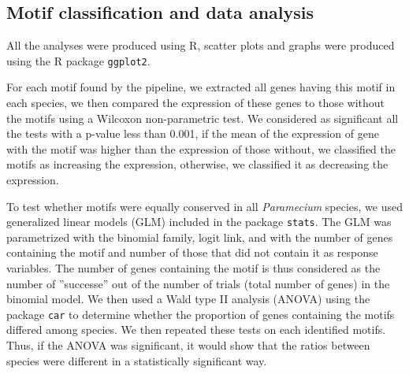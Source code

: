 \subsection*{Motif classification and data analysis}

All the analyses were produced using R, scatter plots and graphs were produced using the R package \texttt{ggplot2}.

For each motif found by the pipeline, we extracted all genes having this motif in each species, we then compared the expression of these genes to those without the motifs using a Wilcoxon non-parametric test. We considered as significant all the tests with a p-value less than 0.001, if the mean of the expression of gene with the motif was higher than the expression of those without, we classified the motifs as increasing the expression, otherwise, we classified it as decreasing the expression.

To test whether motifs were equally conserved in all \textit{Paramecium} species, we used generalized linear models (GLM) included in the package \texttt{stats}. The GLM was parametrized with the binomial family, logit link, and with the number of genes containing the motif and number of those that did not contain it as response variables. The number of genes containing the motif is thus considered as the number of ''successe'' out of the number of trials (total number of genes) in the binomial model. We then used a Wald type II analysis (ANOVA) using the package \texttt{car} to determine whether the proportion of genes containing the motifs differed among species. We then repeated these tests on each identified motifs. Thus, if the ANOVA was significant, it would show that the ratios between species were different in a statistically significant way.

